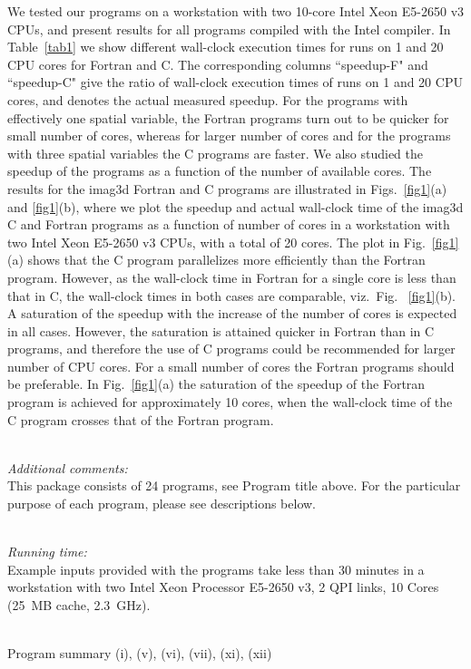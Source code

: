 \documentclass[onecolumn,3p]{elsarticle}
\begin{document}
\begin{small}
We tested our programs on a workstation with two 10-core Intel Xeon E5-2650 v3 CPUs, and present results for all programs compiled with the Intel compiler.
In Table~\ref{tab1} we show different wall-clock execution times for runs on 1 and 20 CPU cores for Fortran and C.
The corresponding columns ``speedup-F" and ``speedup-C" give the ratio of wall-clock execution times of runs on 1 and 20 CPU cores, and denotes 
the actual measured speedup.
For the programs with effectively one spatial variable, the Fortran programs turn out to be quicker for small number of cores, whereas for larger number of cores 
and for the programs with  three spatial variables the C programs are faster.
We also studied the speedup of the programs as a function of the number of available cores.
The results for the imag3d Fortran and C programs are illustrated in Figs.~\ref{fig1}(a) and \ref{fig1}(b), where we plot the speedup and actual wall-clock time of the imag3d C and Fortran programs as a function of number of cores in a workstation
with two Intel Xeon E5-2650 v3 CPUs, with a total of 20 cores. 
The plot in Fig.~\ref{fig1}(a) shows that the C program parallelizes more efficiently than the Fortran program.
However, as the wall-clock time in Fortran for a single core is less than that in C, the wall-clock times in both cases are comparable, viz.~Fig. ~\ref{fig1}(b).
A saturation of the speedup 
with the increase of the number of cores is expected in all cases. However, the saturation is attained quicker in Fortran than in C programs, and therefore the use
of C programs could be  recommended for larger number of CPU cores. For a small number of cores the Fortran programs should be preferable. 
In Fig.~\ref{fig1}(a) the saturation of the speedup of the Fortran program is achieved for  approximately 10 cores, when the wall-clock time of the C program crosses that of the Fortran program.  
 
\noindent\\
{\em Additional comments:}\\
This package consists of 24 programs, see Program title above. For the particular purpose of each program, please see descriptions below.

\noindent\\
{\em Running time:}\\
Example inputs provided with the programs take less than 30 minutes in a workstation with two Intel Xeon Processor E5-2650 v3, 2 QPI links, 10 Cores (25~MB cache, 2.3~GHz).

\noindent\\
Program summary (i), (v), (vi), (vii), (xi), (xii)\\


\end{small}
\end{document}
